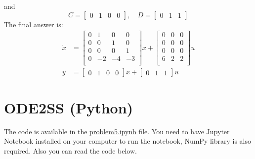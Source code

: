 \documentclass{article}
\begin{document}
    and 
    \begin{equation}
        C = 
        \begin{bmatrix}
            0 & 1 & 0 & 0
        \end{bmatrix}, \quad
        D = 
        \begin{bmatrix}
            0 & 1 & 1
        \end{bmatrix}
    \end{equation}
    The final answer is:
    \begin{align}
        \dot{x} &=
        \begin{bmatrix}
            0 & 1 & 0 & 0\\
            0 & 0 & 1 & 0\\
            0 & 0 & 0 & 1\\
            0 & -2 & -4 & -3\\
        \end{bmatrix}
        x + 
        \begin{bmatrix}
            0 & 0 & 0\\
            0 & 0 & 0\\
            0 & 0 & 0\\
            6 & 2 & 2\\
        \end{bmatrix}
        u\\
        y &= 
        \begin{bmatrix}
            0 & 1 & 0 & 0
        \end{bmatrix}
        x + 
        \begin{bmatrix}
            0 & 1 & 1
        \end{bmatrix}
        u
    \end{align}
    
\section{ODE2SS (Python)}
    The code is available in the \href{run:problem5.ipynb}{problem5.ipynb} file.
    You need to have Jupyter Notebook installed on your computer to run the notebook, NumPy library is also required. Also you can read the code below.
    
\end{document}
